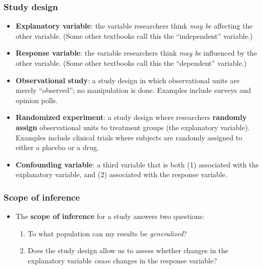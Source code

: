 \documentclass[
]{report}
\begin{document}
\subsubsection*{Study design}\label{study-design}

\begin{itemize}
\item
  \textbf{Explanatory variable}: the variable researchers think \emph{may be} affecting the other variable. (Some other textbooks call this the ``independent'' variable.)
\item
  \textbf{Response variable}: the variable researchers think \emph{may be} influenced by the other variable. (Some other textbooks call this the ``dependent'' variable.)
\item
  \textbf{Observational study}: a study design in which observational units are merely ``observed''; no manipulation is done. Examples include surveys and opinion polls.
\item
  \textbf{Randomized experiment}: a study design where researchers \textbf{randomly assign} observational units to treatment groups (the explanatory variable). Examples include clinical trials where subjects are randomly assigned to either a placebo or a drug.
\item
  \textbf{Confounding variable}: a third variable that is both (1) associated with the explanatory variable, and (2) associated with the response variable.
\end{itemize}

\subsubsection{Scope of inference}\label{scope-of-inference}

\begin{itemize}
\item
  The \textbf{scope of inference} for a study answers two questions:

  \begin{enumerate}
  \def\labelenumi{\arabic{enumi}.}
  \item
    To what population can my results be \emph{generalized}?
  \item
    Does the study design allow us to assess whether changes in the explanatory variable \emph{cause} changes in the response variable?
  \end{enumerate}
\end{itemize}
\end{document}
